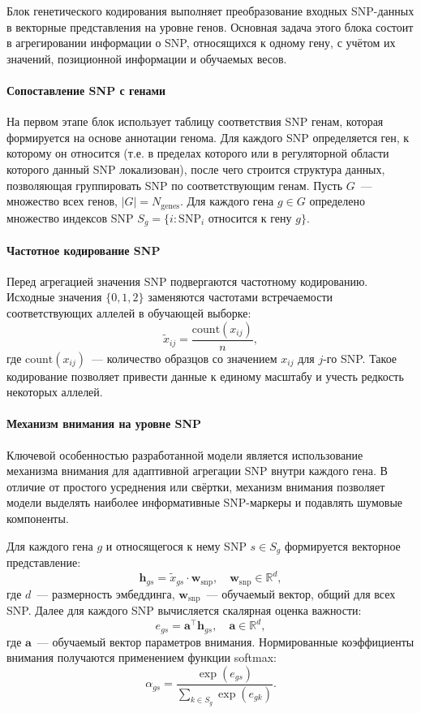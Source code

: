Блок генетического кодирования выполняет преобразование входных SNP-данных 
в векторные представления на уровне генов. Основная задача этого блока 
состоит в агрегировании информации о SNP, относящихся к одному гену, 
с учётом их значений, позиционной информации и обучаемых весов.

\paragraph{Сопоставление SNP с генами}

На первом этапе блок использует таблицу соответствия SNP генам, которая 
формируется на основе аннотации генома. Для каждого SNP определяется ген, 
к которому он относится (т.е. в пределах которого или в регуляторной 
области которого данный SNP локализован), после чего строится структура 
данных, позволяющая группировать SNP по соответствующим генам. Пусть 
$G$~--- множество всех генов, $|G| = N_{\text{genes}}$. Для каждого гена 
$g \in G$ определено множество индексов SNP $S_g = \{i : \text{SNP}_i 
\text{ относится к гену } g\}$.

\paragraph{Частотное кодирование SNP}

Перед агрегацией значения SNP подвергаются частотному кодированию. Исходные 
значения $\{0,1,2\}$ заменяются частотами встречаемости соответствующих 
аллелей в обучающей выборке:
\[
\tilde{x}_{ij} = \frac{\text{count}(x_{ij})}{n},
\]
где $\text{count}(x_{ij})$~--- количество образцов со значением $x_{ij}$ 
для $j$-го SNP. Такое кодирование позволяет привести данные к единому 
масштабу и учесть редкость некоторых аллелей.

\paragraph{Механизм внимания на уровне SNP}

Ключевой особенностью разработанной модели является использование 
механизма внимания для адаптивной агрегации SNP внутри каждого гена. 
В отличие от простого усреднения или свёртки, механизм внимания позволяет 
модели выделять наиболее информативные SNP-маркеры и подавлять шумовые 
компоненты.

Для каждого гена $g$ и относящегося к нему SNP $s \in S_g$ формируется 
векторное представление:
\[
\mathbf{h}_{gs} = \tilde{x}_{gs} \cdot \mathbf{w}_{\text{snp}}, \quad
\mathbf{w}_{\text{snp}} \in \mathbb{R}^d,
\]
где $d$~--- размерность эмбеддинга, $\mathbf{w}_{\text{snp}}$~--- обучаемый 
вектор, общий для всех SNP. Далее для каждого SNP вычисляется скалярная 
оценка важности:
\[
e_{gs} = \mathbf{a}^{\top} \mathbf{h}_{gs}, \quad \mathbf{a} \in \mathbb{R}^d,
\]
где $\mathbf{a}$~--- обучаемый вектор параметров внимания. Нормированные 
коэффициенты внимания получаются применением функции softmax:
\[
\alpha_{gs} = \frac{\exp(e_{gs})}{\sum_{k \in S_g} \exp(e_{gk})}.
\]

